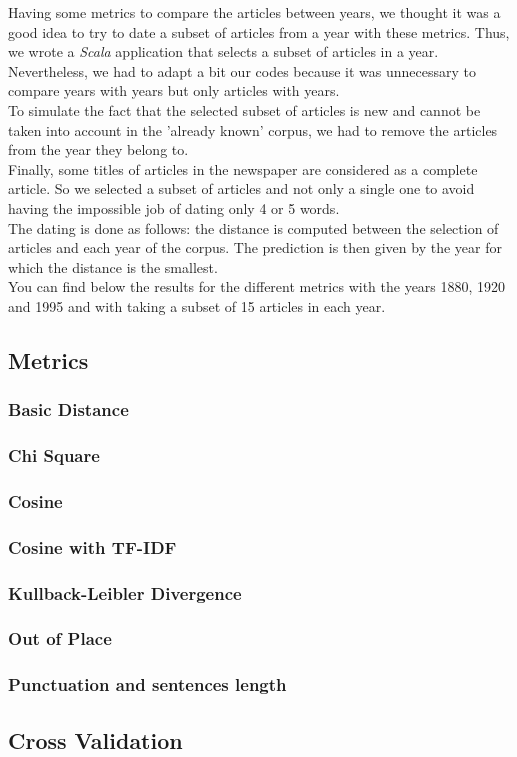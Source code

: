 Having some metrics to compare the articles between years, we thought it was a good idea to try to date a subset of articles from a year with these metrics. Thus, we wrote a \emph{Scala} application that selects a subset of articles in a year.\\
Nevertheless, we had to adapt a bit our codes because it was unnecessary to compare years with years but only articles with years.\\
To simulate the fact that the selected subset of articles is new and cannot be taken into account in the 'already known' corpus, we had to remove the articles from the year they belong to.\\
Finally, some titles of articles in the newspaper are considered as a complete article. So we selected a subset of articles and not only a single one to avoid having the impossible job of dating only 4 or 5 words.\\
The dating is done as follows: the distance is computed between the selection of articles and each year of the corpus. The prediction is then given by the year for which the distance is the smallest.\\

You can find below the results for the different metrics with the years 1880, 1920 and 1995 and with taking a subset of 15 articles in each year.

\subsection{Metrics}

\subsubsection{Basic Distance}

\subsubsection{Chi Square}

\subsubsection{Cosine}

\subsubsection{Cosine with TF-IDF}

\subsubsection{Kullback-Leibler Divergence}


\subsubsection{Out of Place}

\subsubsection{Punctuation and sentences length}


\subsection{Cross Validation}
